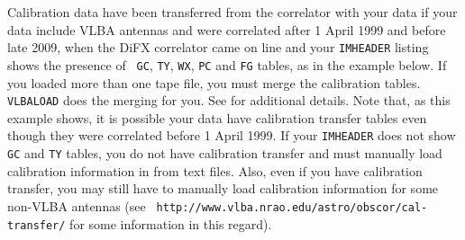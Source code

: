 Calibration data have been transferred from the correlator with your
data if your data include VLBA antennas and were correlated after 1
April 1999 and before late 2009, when the DiFX correlator came on
line and your {\tt IMHEADER} listing shows the presence of {\tt
GC}, {\tt TY}, {\tt WX}, {\tt PC} and {\tt FG} tables, as in the
example below.  If you loaded more than one tape file, you must merge
the calibration tables.  {\tt VLBALOAD} does the merging for you.
See  for
additional details.  Note that, as this example shows, it is possible
your data have calibration transfer tables even though they were
correlated before 1 April 1999.  If your {\tt IMHEADER} does not show
{\tt GC} and {\tt TY} tables, you do not have calibration transfer and
must manually load calibration information in from text files.  Also,
even if you have calibration transfer, you may still have to manually
load calibration information for some non-VLBA antennas (see {\tt
http://www.vlba.nrao.edu/astro/obscor/cal-transfer/} for some
information in this regard).

